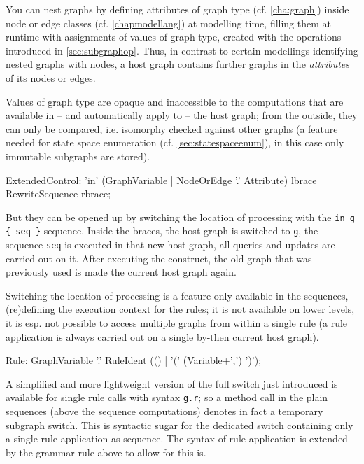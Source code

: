 You can nest graphs by defining attributes of graph type (cf. \ref{cha:graph}) inside node or edge classes (cf. \ref{chapmodellang}) at modelling time, 
filling them at runtime with assignments of values of graph type, created with the operations introduced in \ref{sec:subgraphop}.
Thus, in contrast to certain modellings identifying nested graphs with nodes, a host graph contains further graphs in the \emph{attributes} of its nodes or edges.

Values of graph type are opaque and inaccessible to the computations that are available in -- and automatically apply to -- the host graph; 
from the outside, they can only be compared, i.e. isomorphy checked against other graphs
(a feature needed for state space enumeration (cf. \ref{sec:statespaceenum}), in this case only immutable subgraphs are stored).

\begin{rail} 
  ExtendedControl: 
    'in' (GraphVariable | NodeOrEdge '.' Attribute) lbrace RewriteSequence rbrace;
\end{rail}

But they can be opened up by switching the location of processing with the \verb#in g { seq }# sequence.
Inside the braces, the host graph is switched to \texttt{g}, the sequence \texttt{seq} is executed in that new host graph, all queries and updates are carried out on it. 
After executing the construct, the old graph that was previously used is made the current host graph again.

Switching the location of processing is a feature only available in the sequences, (re)defining the execution context for the rules; it is not available on lower levels, it is esp. not possible to access multiple graphs from within a single rule (a rule application is always carried out on a single by-then current host graph).

\begin{rail}
  Rule: GraphVariable '.' RuleIdent (() | '(' (Variable+',') ')');
\end{rail}

A simplified and more lightweight version of the full switch just introduced is available for single rule calls with syntax \verb#g.r#; so a method call in the plain sequences (above the sequence computations) denotes in fact a temporary subgraph switch.
This is syntactic sugar for the dedicated switch containing only a single rule application as sequence.
The syntax of rule application is extended by the grammar rule above to allow for this is.

